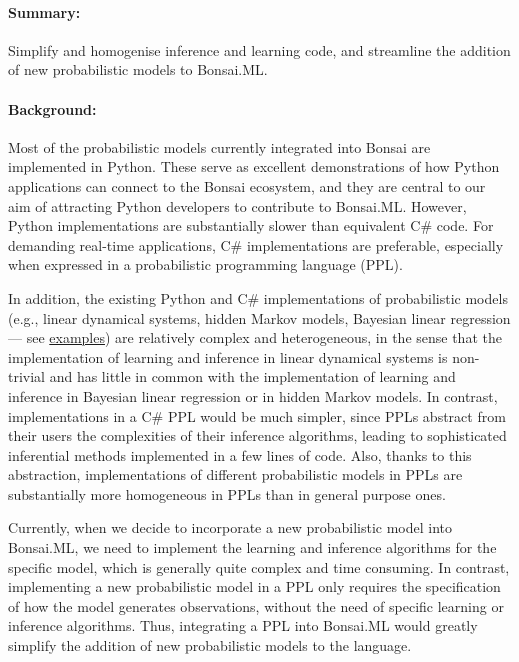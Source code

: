 \paragraph{Summary:} Simplify and homogenise inference and learning code, and streamline the addition of new probabilistic models to Bonsai.ML.

\paragraph{Background:} Most of the probabilistic models currently integrated
into Bonsai are implemented in Python. These serve as excellent demonstrations
of how Python applications can connect to the Bonsai ecosystem, and they are
central to our aim of attracting Python developers to contribute to Bonsai.ML.
%
However, Python implementations are substantially slower than equivalent C\#
code. For demanding real-time applications, C\# implementations are preferable,
especially when expressed in a probabilistic programming language (PPL).

In addition, the existing Python and C\# implementations of probabilistic
models (e.g., linear dynamical systems, hidden Markov models, Bayesian linear
regression — see
\href{https://bonsai-rx.org/machinelearning/examples/README.html}{examples})
are relatively complex and heterogeneous, in the sense that the implementation
of learning and inference in linear dynamical systems is non-trivial and has
little in common with the implementation of learning and inference in Bayesian
linear regression or in hidden Markov models.
%
In contrast, implementations in a C\# PPL would be much simpler, since PPLs
abstract from their users the complexities of their inference algorithms,
leading to sophisticated inferential methods implemented in a few lines of
code.
%
Also, thanks to this abstraction, implementations of different probabilistic
models in PPLs are substantially more homogeneous in PPLs than in general
purpose ones.

Currently, when we decide to incorporate a new probabilistic model into
Bonsai.ML, we need to implement the learning and inference algorithms for the
specific model, which is generally quite complex and time consuming.
%
In contrast, implementing a new probabilistic model in a PPL only requires the
specification of how the model generates observations, without the
need of specific learning or inference algorithms.
%
Thus, integrating a PPL into Bonsai.ML would greatly simplify the addition of
new probabilistic models to the language.

